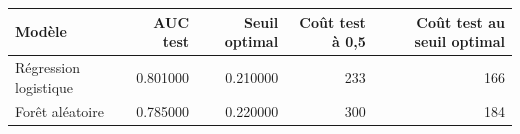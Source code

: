 \begin{tabular}{lrrrr}
\toprule
Modèle & AUC test & Seuil optimal & Coût test à 0,5 & Coût test au seuil optimal \\
\midrule
Régression logistique & 0.801000 & 0.210000 & 233 & 166 \\
Forêt aléatoire & 0.785000 & 0.220000 & 300 & 184 \\
\bottomrule
\end{tabular}
